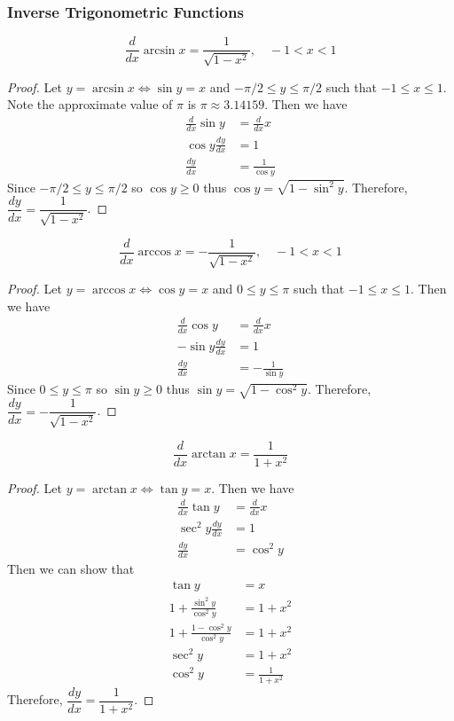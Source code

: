\subsubsection*{Inverse Trigonometric Functions}
\begin{theorem}
    \[\frac{d}{dx}\arcsin x=\frac{1}{\sqrt{1-x^2}},\quad -1<x<1 \]
\end{theorem}
\begin{proof}
    Let \(y=\arcsin x \iff \sin y=x\) and \(-\pi/2\leq y\leq\pi/2\) such that
    \(-1\leq x\leq 1\).
    Note the approximate value of \(\pi\) is \(\pi\approx 3.14159\).
    Then we have
    \begin{align*}
        \frac{d}{dx}\sin y &= \frac{d}{dx}x \\ \cos y\frac{dy}{dx} &= 1 \\
        \frac{dy}{dx} &= \frac{1}{\cos y}
    \end{align*}
    Since \(-\pi/2\leq y\leq\pi/2\) so \(\cos y\geq0\) thus
    \(\cos y=\sqrt{1-\sin^2 y}\).
    Therefore, \(\dfrac{dy}{dx}=\dfrac{1}{\sqrt{1-x^2}}\).
\end{proof}
\begin{theorem}
    \[\frac{d}{dx}\arccos x=-\frac{1}{\sqrt{1-x^2}},\quad -1<x<1 \]
\end{theorem}
\begin{proof}
    Let \(y=\arccos x \iff \cos y=x\) and \(0\leq y\leq\pi\) such that
    \(-1\leq x\leq 1\).
    Then we have
    \begin{align*}
        \frac{d}{dx}\cos y &= \frac{d}{dx}x \\ -\sin y\frac{dy}{dx} &= 1 \\
        \frac{dy}{dx} &= -\frac{1}{\sin y}
    \end{align*}
    Since \(0\leq y\leq\pi\) so \(\sin y\geq0\) thus
    \(\sin y=\sqrt{1-\cos^2 y}\).
    Therefore, \(\dfrac{dy}{dx}=-\dfrac{1}{\sqrt{1-x^2}}\).
\end{proof}
\begin{theorem}
    \[\frac{d}{dx}\arctan x=\frac{1}{1+x^2} \]
\end{theorem}
\begin{proof}
    Let \(y=\arctan x \iff \tan y=x\).
    Then we have
    \begin{align*}
        \frac{d}{dx}\tan y &= \frac{d}{dx}x \\ \sec^2 y\frac{dy}{dx} &= 1 \\
        \frac{dy}{dx} &= \cos^2 y
    \end{align*}
    Then we can show that
    \begin{align*}
        \tan y &= x \\ 1+\frac{\sin^2 y}{\cos^2 y} &= 1+x^2\\
        1+\frac{1-\cos^2 y}{\cos^2 y} &= 1+x^2 \\ \sec^2 y &= 1+x^2 \\
        \cos^2y &= \frac{1}{1+x^2}
    \end{align*}
    Therefore, \(\dfrac{dy}{dx}=\dfrac{1}{1+x^2}\).
\end{proof}